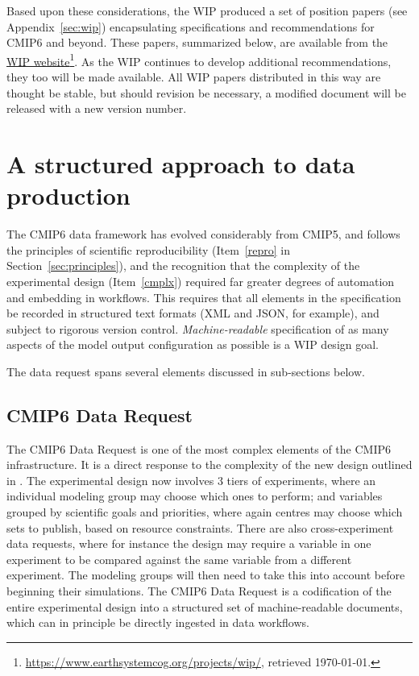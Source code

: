 \documentclass[gmd,manuscript]{copernicus}
\newcommand{\pllabel}[1]{\label{p-#1}\linelabel{l-#1}}
\newcommand{\urlref}[2] {\href{#1}{#2}\footnote{\url{#1}, retrieved \today.}}
\begin{document}
Based upon these considerations, the WIP produced a set of position
papers (see Appendix~\ref{sec:wip}) encapsulating specifications and
recommendations for CMIP6 and beyond. These papers, summarized below,
are available from the
\urlref{https://www.earthsystemcog.org/projects/wip/}{WIP website}. As
the WIP continues to develop additional recommendations, they too will
be made available. All WIP papers distributed in this way are thought
be stable, but should revision be necessary, a modified document will
be released with a new version number.

\section{A structured approach to data production}
\label{sec:dreq}

The CMIP6 data framework has evolved considerably from CMIP5, and
follows the principles of scientific reproducibility (Item~\ref{repro}
in Section~\ref{sec:principles}), and the recognition that the
complexity of the experimental design (Item~\ref{cmplx}) required far
greater degrees of automation and embedding in workflows. This
requires that all elements in the specification be recorded in
structured text formats (XML and JSON, for example), and subject to
rigorous version control. \emph{Machine-readable} specification of as
many aspects of the model output configuration as possible is a WIP
design goal.

The data request spans several elements discussed in sub-sections
below.

\subsection{CMIP6 Data Request}
\label{sec:data-request}

\pllabel{RC2-18}
The CMIP6 Data Request is one of the most complex elements of the
CMIP6 infrastructure. It is a direct response to the complexity of the
new design outlined in \cite{ref:eyringetal2016a}. The experimental
design now involves 3 tiers of experiments, where an individual
modeling group may choose which ones to perform; and variables grouped
by scientific goals and priorities, where again centres may choose
which sets to publish, based on resource constraints. There are also
cross-experiment data requests, where for instance the design may
require a variable in one experiment to be compared against the same
variable from a different experiment. The modeling groups will then
need to take this into account before beginning their simulations. The
CMIP6 Data Request is a codification of the entire experimental design
into a structured set of machine-readable documents, which can in
principle be directly ingested in data workflows.
\end{document}

